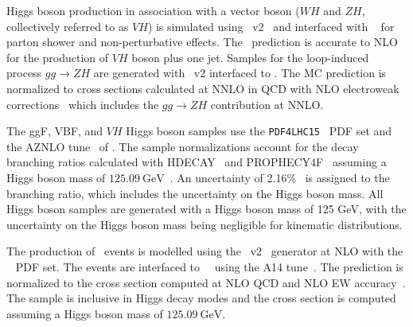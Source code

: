 Higgs boson production in association with a vector boson ($WH$ and $ZH$, collectively referred to as $VH$) is simulated using \powhegbox~v2~\cite{Nason:2009ai,Alioli:2010xd,Nason:2004rx,Frixione:2007vw} and interfaced with ~\cite{Sjostrand:2014zea} for parton shower and non-perturbative effects.
The \POWHEG\ prediction is accurate to NLO for the production of $VH$ boson plus one jet. Samples for the loop-induced process $gg \to ZH$ are generated with \powhegbox~v2 interfaced to .
The MC prediction is normalized to cross sections calculated at NNLO in QCD with NLO electroweak corrections~\cite{Ciccolini:2003jy, Brein:2003wg, Brein:2011vx, Denner:2014cla, Brein:2012ne} which includes the $gg \to ZH$ contribution at NNLO.

The ggF, VBF, and $VH$ Higgs boson samples use the \texttt{PDF4LHC15}~\cite{Butterworth:2015oua} PDF set and the AZNLO tune~\cite{STDM-2012-23} of . The sample normalizations account for the decay branching ratios calculated with \textsc{HDECAY}~\cite{Djouadi:1997yw, Spira:1997dg, Djouadi:2006bz} and \textsc{PROPHECY4F}~\cite{Bredenstein:2006ha, Bredenstein:2006rh, Bredenstein:2006nk} assuming a Higgs boson mass of $\SI{125.09}{\GeV}$~\cite{HIGG-2014-14}. An uncertainty of 2.16\%~\cite{deFlorian:2016spz} is assigned to the \hww branching ratio, which includes the uncertainty on the Higgs boson mass. All Higgs boson samples are generated with a Higgs boson mass of 125 GeV, with the uncertainty on the Higgs boson mass being negligible for kinematic distributions.

The production of \ttH\ events is modelled using the \powhegbox~v2~\cite{Frixione:2007nw,Nason:2004rx,Frixione:2007vw,Alioli:2010xd,Hartanto:2015uka} generator at NLO with the \nnpdfnlo~\cite{Ball:2014uwa} PDF set.
The events are interfaced to ~\cite{Sjostrand:2014zea}~using the A14 tune~\cite{ATL-PHYS-PUB-2014-021}.
The prediction is normalized to the cross section computed at NLO QCD and NLO EW accuracy~\cite{deFlorian:2016spz}.
The sample is inclusive in Higgs decay modes and the cross section is computed assuming a Higgs boson mass of $\SI{125.09}{\GeV}$.


